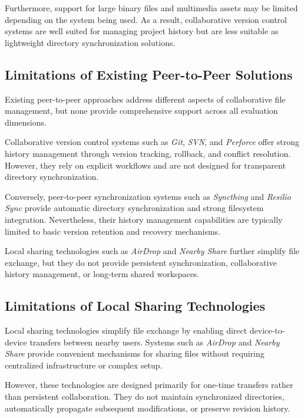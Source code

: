 Furthermore, support for large binary files and multimedia
assets may be limited depending on the system being used. As a
result, collaborative version control systems are well suited
for managing project history but are less suitable as
lightweight directory synchronization solutions.

\subsection{Limitations of Existing Peer-to-Peer Solutions}

Existing peer-to-peer approaches address different aspects of
collaborative file management, but none provide comprehensive
support across all evaluation dimensions.

Collaborative version control systems such as
\textit{Git}, \textit{SVN}, and \textit{Perforce} offer strong
history management through version tracking, rollback, and
conflict resolution. However, they rely on explicit workflows
and are not designed for transparent directory
synchronization.

Conversely, peer-to-peer synchronization systems such as
\textit{Syncthing} and \textit{Resilio Sync} provide automatic
directory synchronization and strong filesystem integration.
Nevertheless, their history management capabilities are
typically limited to basic version retention and recovery
mechanisms.

Local sharing technologies such as \textit{AirDrop} and
\textit{Nearby Share} further simplify file exchange, but they
do not provide persistent synchronization, collaborative
history management, or long-term shared workspaces.

\subsection{Limitations of Local Sharing Technologies}

Local sharing technologies simplify file exchange by enabling
direct device-to-device transfers between nearby users.
Systems such as \textit{AirDrop} and \textit{Nearby Share}
provide convenient mechanisms for sharing files without
requiring centralized infrastructure or complex setup.

However, these technologies are designed primarily for
one-time transfers rather than persistent collaboration. They
do not maintain synchronized directories, automatically
propagate subsequent modifications, or preserve revision
history.

